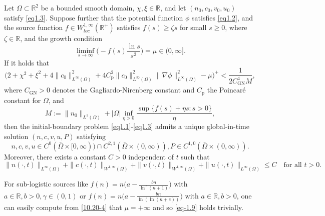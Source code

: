 \documentclass[reqno]{amsart}
\begin{document}
\begin{theorem}\label{Th1.1}
Let $\Omega \subset \mathbb{R}^2$ be a bounded smooth domain, 
$\chi, \xi \in \mathbb{R}$, and let $(n_0, c_0, v_0, u_0)$ satisfy \eqref{eq1.3}. 
Suppose further that the potential function $\phi$ satisfies \eqref{eq1.2}, and
the source function $f\in W_{loc}^{1, \infty}(\mathbb{R}^+)$ satisfies 
$f(s)\geq \zeta s$ for small $s\geq0$, where $\zeta\in \mathbb{R}$, and the growth 
condition
\begin{equation}\label{10.20-4}
\liminf_{s \to \infty} \Big( - f(s) \frac{\ln s}{s^2} \Big) = \mu \in (0, \infty].
\end{equation}
If it holds that
\begin{equation}\label{eq-1.9}
\Big(2 + \chi^2 + \xi^2 + 4\|c_0\|_{L^\infty(\Omega)}^2
+ 4 C_{\mathrm{p}}^2\|c_0\|_{L^\infty(\Omega)}^2 \|\nabla \phi\|_{L^\infty(\Omega)}^2 
-\mu\Big)^+ < \frac{1}{2 C_{\mathrm{GN}}^4 M},
\end{equation}
where $C_{\mathrm{GN}} > 0$ denotes the Gagliardo-Nirenberg constant and 
$C_{\mathrm{p}}$ the Poincar\'e constant for $\Omega$, and 
\begin{equation}\label{eq-1.10}
M :=\|n_0\|_{L^1(\Omega)}+|\Omega| \inf_{\eta>0} 
\frac{\sup \{ f(s) + \eta s : s > 0 \}}{\eta},
\end{equation}
then the initial-boundary problem \eqref{eq1.1}-\eqref{eq1.3} admits a unique 
global-in-time solution $(n, c, v, u, P)$ satisfying
\begin{equation}\label{eq-1.11}
n, c, v, u \in C^0(\bar{\Omega} \times [0, \infty)) \cap C^{2, 1}(\bar{\Omega} \times (0, \infty)), P \in C^{1, 0}(\bar{\Omega} \times (0, \infty)).
\end{equation}
Moreover, there exists a constant $C > 0$ independent of $t$ such that
\begin{equation}\label{eq-1.12}
\| n(\cdot, t) \|_{L^\infty(\Omega)} + \| c(\cdot, t) \|_{W^{1,\infty}(\Omega)} 
+ \|v(\cdot, t)\|_{W^{1,\infty}(\Omega)} + \| u(\cdot, t)
\|_{L^\infty(\Omega)} \leq C  \quad \text{for all } t > 0.
\end{equation}
\end{theorem}

\begin{remark}\label{rem1.1} \rm
For sub-logistic sources like \( f(n) = n \bigl( a- \frac{bn}{\ln^\gamma(n+1)}\bigr)\) 
with \( a \in \mathbb{R}, b > 0, \gamma \in (0,1) \) or 
\( f(n) = n\bigl(a-\frac{bn}{\ln(\ln(n+e))}\bigr)\) with \( a \in \mathbb{R}, b>0\), 
one can easily compute from \eqref{10.20-4} that \( \mu= +\infty \) and so 
\eqref{eq-1.9} holds trivially.
\end{remark}
\end{document}
